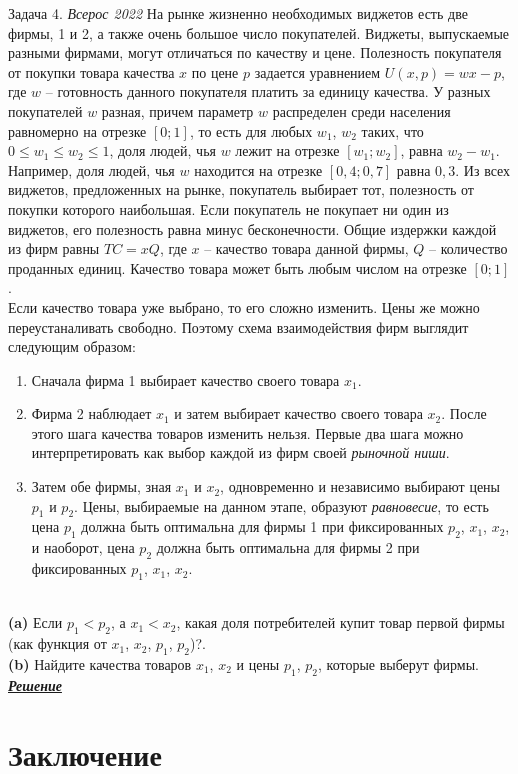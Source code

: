\begin{mybox}{Задача 4. \textit{Всерос 2022}}
    \indent\setlength{\parindent}{1em}\indent\setlength{\parindent}{1em}На рынке жизненно необходимых виджетов есть две
    фирмы, 1 и 2, а также очень большое число покупателей. Виджеты, выпускаемые разными фирмами, могут отличаться по
    качеству и цене. Полезность покупателя от покупки товара качества $x$ по цене $p$ задается уравнением
    $U(x,p)=wx-p$, где $w$ – готовность данного покупателя платить за единицу качества. У разных покупателей $w$
    разная, причем параметр $w$ распределен среди населения равномерно на отрезке $[0; 1]$, то есть для любых $w_1$,
    $w_2$ таких, что $0\leq w_1 \leq w_2 \leq 1$, доля людей, чья $w$ лежит на отрезке $[w_1;w_2]$, равна $w_2 - w_1$.
    Например, доля людей, чья $w$ находится на отрезке $[0,4; 0,7]$ равна $0,3$. Из всех виджетов, предложенных на
    рынке, покупатель выбирает тот, полезность от покупки которого наибольшая. Если покупатель не покупает ни один из
    виджетов, его полезность равна минус бесконечности. Общие издержки каждой из фирм равны $TC=xQ$, где $x$ – качество
    товара данной фирмы, $Q$ – количество проданных единиц. Качество товара может быть любым числом на отрезке $[0; 1]$.\\
    \indent\setlength{\parindent}{1em}\indent\setlength{\parindent}{1em}Если качество товара уже выбрано, то его сложно
    изменить. Цены же можно переустаналивать свободно. Поэтому схема взаимодействия фирм выглядит следующим образом:
    \begin{enumerate}
        \item Сначала фирма 1 выбирает качество своего товара $x_1$.
        \item Фирма 2 наблюдает $x_1$ и затем выбирает качество своего товара $x_2$. После этого шага качества товаров
        изменить нельзя. Первые два шага можно интерпретировать как выбор каждой из фирм своей \textit{рыночной ниши}.
        \item Затем обе фирмы, зная $x_1$ и $x_2$, одновременно и независимо выбирают цены $p_1$ и $p_2$. Цены,
        выбираемые на данном этапе, образуют \textit{равновесие}, то есть цена $p_1$ должна быть оптимальна для фирмы 1 при
        фиксированных $p_2$, $x_1$, $x_2$, и наоборот, цена $p_2$ должна быть оптимальна для фирмы 2 при фиксированных
        $p_1$, $x_1$, $x_2$.
    \end{enumerate}\smallskip\\
    \indent\setlength{\parindent}{1em}\indent\setlength{\parindent}{1em}\textbf{(a)} Если $p_1<p_2$, а $x_1<x_2$, какая доля потребителей купит товар
    первой фирмы (как функция от $x_1$, $x_2$, $p_1$, $p_2$)?.\smallskip\\
    \indent\setlength{\parindent}{1em}\textbf{(b)} Найдите качества товаров $x_1$, $x_2$ и цены $p_1$, $p_2$, которые
    выберут фирмы.\bigskip\\
    \textit{\textbf{\centering\href{https://iloveeconomics.ru/sites/default/files/olimp/vseros/2022/vseros_2022_solutions_10_23379.pdf}{Решение}}}
\end{mybox}



\chapter{Заключение}

